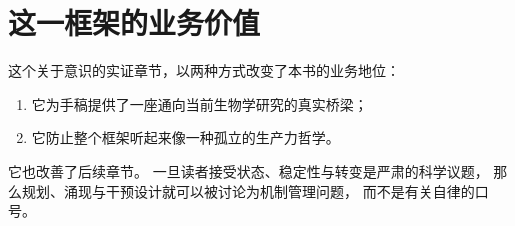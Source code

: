 \section{这一框架的业务价值}

这个关于意识的实证章节，以两种方式改变了本书的业务地位：
\begin{enumerate}[nosep]
  \item 它为手稿提供了一座通向当前生物学研究的真实桥梁；
  \item 它防止整个框架听起来像一种孤立的生产力哲学。
\end{enumerate}

它也改善了后续章节。
一旦读者接受状态、稳定性与转变是严肃的科学议题，
那么规划、涌现与干预设计就可以被讨论为机制管理问题，
而不是有关自律的口号。